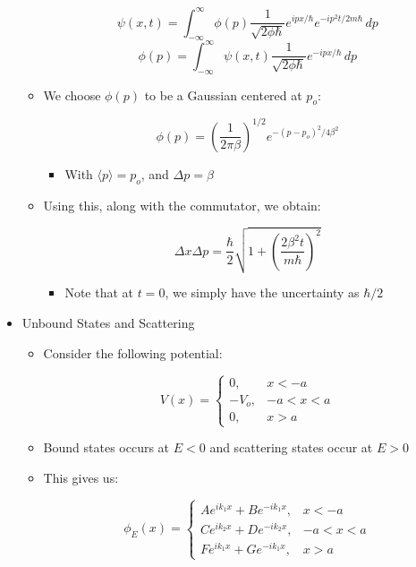\begin{itemize}
\begin{itemize}
        $$\psi(x,t)=\int_{-\infty}^{\infty}\phi(p)\frac{1}{\sqrt{2\phi\hbar}}e^{ipx/\hbar}e^{-ip^2t/2m\hbar}\,dp$$
        $$\phi(p)=\int_{-\infty}^{\infty}\psi(x,t)\frac{1}{\sqrt{2\phi\hbar}}e^{-ipx/\hbar}\,dp$$

      \item We choose $\phi(p)$ to be a Gaussian centered at $p_o$:

        $$\phi(p)=\left( \frac{1}{2\pi\beta} \right)^{1/2}e^{-(p-p_o)^2/4\beta^2}$$

        \begin{itemize}

          \item With $\langle p\rangle=p_o$, and $\Delta p=\beta$

        \end{itemize}

      \item Using this, along with the commutator, we obtain:

        $$\Delta x\Delta p=\frac{\hbar}{2}\sqrt{1+\left( \frac{2\beta^2t}{m\hbar}\right)^2}$$

        \begin{itemize}

          \item Note that at $t=0$, we simply have the uncertainty as $\hbar/2$

        \end{itemize}

    \end{itemize}

  \item Unbound States and Scattering

    \begin{itemize}

      \item Consider the following potential:

        $$V(x)=\left\{\begin{array}{ll} 0,&x<-a\\-V_o,& -a<x<a\\0,&x>a\end{array}$$

      \item Bound states occurs at $E<0$ and scattering states occur at $E>0$

      \item This gives us:

        $$\phi_E(x)=\left\{\begin{array}{ll} Ae^{ik_1x}+Be^{-ik_1x},&x<-a\\Ce^{ik_2x}+De^{-ik_2x},& -a<x<a\\Fe^{ik_1x}+Ge^{-ik_1x},&x>a\end{array}$$


\end{itemize}
\end{itemize}
